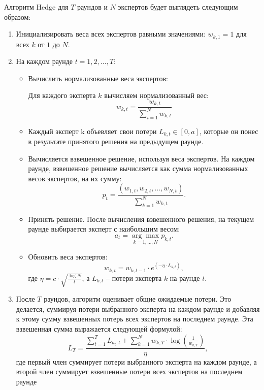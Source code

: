 \documentclass[a4paper,14pt]{extarticle}
\begin{document}
Алгоритм Hedge для $T$ раундов и $N$ экспертов будет выглядеть следующим образом:
\begin{enumerate}
    \item Инициализировать веса всех экспертов равными значениями: $w_{k,1} = 1$ для всех $k$ от $1$ до $N$.

\item На каждом раунде $t = 1,2,\dots,T$:
\begin{itemize}
    \item Вычислить нормализованные веса экспертов:

    Для каждого эксперта $k$ вычисляем нормализованный вес:
    $$w_{k,t} = \frac{w_{k,t}}{\sum_{i=1}^{N}w_{k,t}}$$
    \item Каждый эксперт k объевляет свои потери $L_{k,t} \in [0, a]$, которые он понес в результате принятого решения на предыдущем раунде.

    \item Вычисляется взвешенное решение, используя веса экспертов. На каждом раунде, взвешенное решение вычисляется как сумма нормализованных весов экспертов, на их сумму:
    \begin{equation}
    p_{t} = \frac{(w_{1,t}, w_{2,t},\dots,w_{N,t})}{\sum_{k=1}^N w_{k,t}}.
    \end{equation}
    \item Принять решение. После вычисления взвешенного решения, на текущем раунде выбирается эксперт с наибольшим весом:
    \begin{equation}a_{t} = \underset{k=1,\dots,N}{\arg\max}p_{k,t}.\end{equation}
    \item Обновить веса экспертов:
    \begin{equation}
     w_{k,t} = w_{k,t-1}  \cdot e^{(-\eta \cdot L_{k,t})},
     \end{equation} где $\eta = c \cdot \sqrt{\frac{\log N}{t}}$, а $L_{k,t}$ – потери эксперта $k$ на раунде $t$.
\end{itemize}
    \item После $T$ раундов, алгоритм оценивает общие ожидаемые потери. Это делается, суммируя потери выбранного эксперта на каждом раунде и добавляя к этому сумму взвешенных потерь всех экспертов на последнем раунде. Эта взвешенная сумма выражается следующей формулой:\begin{equation} L_T = \frac{\sum_{t=1}^T L_{a_t,t} + \sum_{k=1}^N w_{k,T} \cdot \log(\frac{1}{w_{k,T}})}{\eta},\end{equation}
    где первый член суммирует потери выбранного эксперта на каждом раунде, а второй член суммирует взвешенные потери всех экспертов на последнем раунде

\end{enumerate}
\end{document}
